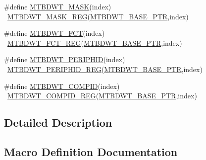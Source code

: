 \begin{DoxyCompactItemize}
\item 
\#define \hyperlink{group___m_t_b_d_w_t___register___accessor___macros_ga599656176ea9b8570a4d7449d5b5a789}{M\+T\+B\+D\+W\+T\+\_\+\+M\+A\+SK}(index)                                          ~\hyperlink{group___m_t_b_d_w_t___register___accessor___macros_ga5c5b8f3ae38de9e3006737c92fc2814c}{M\+T\+B\+D\+W\+T\+\_\+\+M\+A\+S\+K\+\_\+\+R\+EG}(\hyperlink{group___m_t_b_d_w_t___peripheral_ga97d048bfb5a11293a38c444b8347ff42}{M\+T\+B\+D\+W\+T\+\_\+\+B\+A\+S\+E\+\_\+\+P\+TR},index)
\item 
\#define \hyperlink{group___m_t_b_d_w_t___register___accessor___macros_gac02bd48b3a9116f036027c930ad6034b}{M\+T\+B\+D\+W\+T\+\_\+\+F\+CT}(index)                                            ~\hyperlink{group___m_t_b_d_w_t___register___accessor___macros_gaa319e11200b9cc2fe7bfb0b5dd40d0e8}{M\+T\+B\+D\+W\+T\+\_\+\+F\+C\+T\+\_\+\+R\+EG}(\hyperlink{group___m_t_b_d_w_t___peripheral_ga97d048bfb5a11293a38c444b8347ff42}{M\+T\+B\+D\+W\+T\+\_\+\+B\+A\+S\+E\+\_\+\+P\+TR},index)
\item 
\#define \hyperlink{group___m_t_b_d_w_t___register___accessor___macros_ga29f7335807f02b6c76acf31f521eb8ab}{M\+T\+B\+D\+W\+T\+\_\+\+P\+E\+R\+I\+P\+H\+ID}(index)                                  ~\hyperlink{group___m_t_b_d_w_t___register___accessor___macros_ga18a6f971f5ddf5bd0f3c5fd2d2b3b2da}{M\+T\+B\+D\+W\+T\+\_\+\+P\+E\+R\+I\+P\+H\+I\+D\+\_\+\+R\+EG}(\hyperlink{group___m_t_b_d_w_t___peripheral_ga97d048bfb5a11293a38c444b8347ff42}{M\+T\+B\+D\+W\+T\+\_\+\+B\+A\+S\+E\+\_\+\+P\+TR},index)
\item 
\#define \hyperlink{group___m_t_b_d_w_t___register___accessor___macros_ga12a167f03c2333dd1f5e864a388e2084}{M\+T\+B\+D\+W\+T\+\_\+\+C\+O\+M\+P\+ID}(index)                                      ~\hyperlink{group___m_t_b_d_w_t___register___accessor___macros_gae2528012848814bf317362965a786094}{M\+T\+B\+D\+W\+T\+\_\+\+C\+O\+M\+P\+I\+D\+\_\+\+R\+EG}(\hyperlink{group___m_t_b_d_w_t___peripheral_ga97d048bfb5a11293a38c444b8347ff42}{M\+T\+B\+D\+W\+T\+\_\+\+B\+A\+S\+E\+\_\+\+P\+TR},index)
\end{DoxyCompactItemize}


\subsection{Detailed Description}


\subsection{Macro Definition Documentation}
